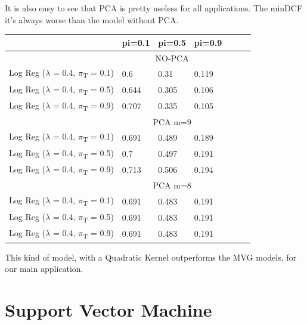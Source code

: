 \documentclass[english]{report}
\begin{document}
It is also easy to see that PCA is pretty useless for all applications.
The minDCF it's always worse than the model without PCA\@.

\begin{table}[H]
    \centering
    \begin{tabular}{lllllll}
        \toprule
                                & pi=0.1 & pi=0.5 & pi=0.9 \\ \midrule
                                & \multicolumn{3}{c}{NO-PCA}  \\
    Log Reg ($\lambda$ = 0.4, $\pi$\textsubscript{T} = 0.1)   & 0.6      & 0.31      & 0.119      \\
    Log Reg ($\lambda$ = 0.4, $\pi$\textsubscript{T} = 0.5)   & 0.644      & 0.305      & 0.106       \\
    Log Reg ($\lambda$ = 0.4, $\pi$\textsubscript{T} = 0.9)   & 0.707      & 0.335      & 0.105      \\ \midrule
                                & \multicolumn{3}{c}{PCA m=9}  \\
    Log Reg ($\lambda$ = 0.4, $\pi$\textsubscript{T} = 0.1)   & 0.691      & 0.489       & 0.189       \\
    Log Reg ($\lambda$ = 0.4, $\pi$\textsubscript{T} = 0.5)   & 0.7      & 0.497      & 0.191      \\
    Log Reg ($\lambda$ = 0.4, $\pi$\textsubscript{T} = 0.9)   & 0.713      & 0.506      & 0.194      \\ \midrule
                                & \multicolumn{3}{c}{PCA m=8}  \\
    Log Reg ($\lambda$ = 0.4, $\pi$\textsubscript{T} = 0.1)   & 0.691       & 0.483       & 0.191       \\
    Log Reg ($\lambda$ = 0.4, $\pi$\textsubscript{T} = 0.5)   & 0.691      & 0.483      & 0.191      \\
    Log Reg ($\lambda$ = 0.4, $\pi$\textsubscript{T} = 0.9)   & 0.691      & 0.483      & 0.191      \\
    \bottomrule
    \end{tabular}
    \label{tab:QuadLogReg_valid}
\end{table}

This kind of model, with a Quadratic Kernel outperforms the MVG models, for our main application.

\clearpage

\section{Support Vector Machine}
\end{document}
